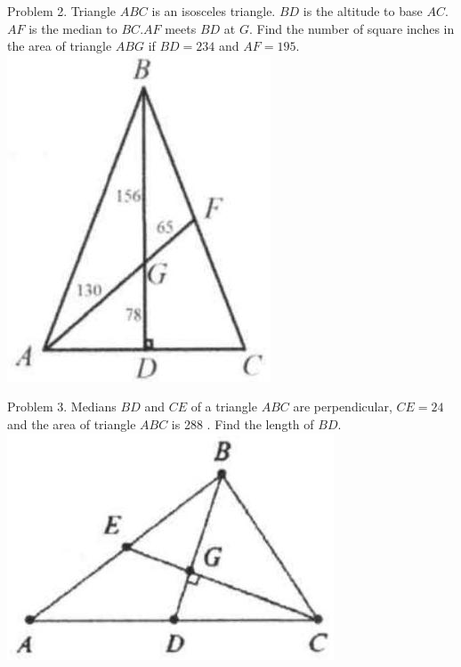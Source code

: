 \documentclass[10pt]{article}
\begin{document}
Problem 2. Triangle \(A B C\) is an isosceles triangle. \(B D\) is the altitude to base \(A C\). \(A F\) is the median to \(B C . A F\) meets \(B D\) at \(G\). Find the number of square inches in the area of triangle \(A B G\) if \(B D=234\) and \(A F=195\).\\
\includegraphics[max width=\textwidth, center]{2025_04_17_97bc1f7e44d93c271a88g-015(1)}

Problem 3. Medians \(B D\) and \(C E\) of a triangle \(A B C\) are perpendicular, \(C E=24\) and the area of triangle \(A B C\) is 288 . Find the length of \(B D\).\\
\includegraphics[max width=\textwidth, center]{2025_04_17_97bc1f7e44d93c271a88g-015(2)}
\end{document}
